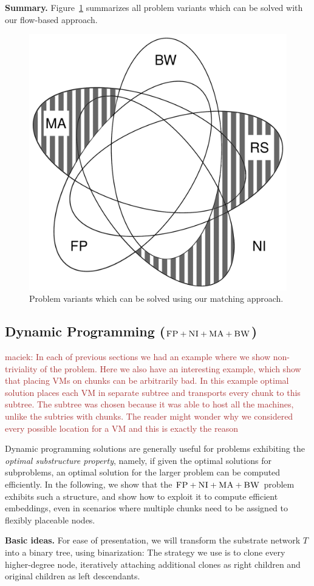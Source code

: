 \documentclass[9pt]{sigcomm-alternate}
\newcommand{\maciek}[1]{\textcolor{brown}{maciek: #1}}
\newcommand{\CC}{\textsc{NI}}
\newcommand{\FP}{\textsc{FP}}
\newcommand{\BW}{\textsc{BW}}
\newcommand{\MA}{\textsc{MA}}
\newcommand{\Tree}{\ensuremath{T}}
\begin{document}
\textbf{Summary.}
Figure~\ref{fig:venn_match} summarizes all problem
variants which can be solved with our flow-based approach.
\begin{figure}
\includegraphics[width=0.48\columnwidth]{figs/venn_matching.pdf}
\caption{Problem variants which can be solved using our matching approach.}
\label{fig:venn_match}
\end{figure}


\subsection{Dynamic Programming ($\FP+\CC+\MA+\BW$)}\label{ssec:dyn}

\maciek{In each of previous sections we had an example where we show
  non-triviality of the problem. Here we also have an interesting
  example, which show that placing VMs on chunks can be arbitrarily
  bad. In this example optimal solution places each VM in separate
  subtree and transports every chunk to this subtree. The subtree was
  chosen because it was able to host all the machines, unlike the
  subtries with chunks. The reader might wonder why we considered
  every possible location for a VM and this is exactly the reason}

Dynamic programming solutions are generally useful for problems
exhibiting the \emph{optimal substructure property}, namely, if given
the optimal solutions for subproblems, an optimal solution for the
larger problem can be computed efficiently.
In the following, we show that the $\FP+\CC+\MA+\BW$ problem
exhibits such a structure, and show how to exploit it to
compute efficient embeddings, even in scenarios where multiple chunks
need to be assigned to flexibly placeable nodes.

\textbf{Basic ideas.} For ease of presentation, we will transform the substrate network $\Tree$
into a binary tree, using binarization:
The
strategy we use is to clone every higher-degree node,
iteratively attaching additional clones as right children 
and original children as left descendants. 
\end{document}
